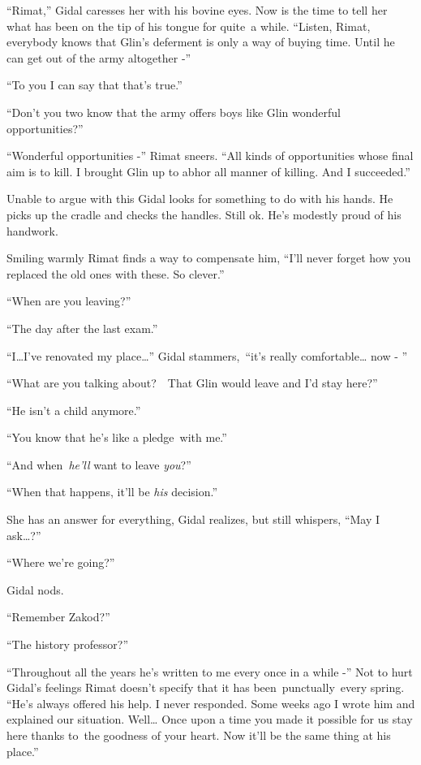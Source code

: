 \documentclass[twoside,11pt]{book}
\begin{document}
``Rimat,'' Gidal caresses her with his bovine eyes. Now is the time to tell her what has been
on the tip of his tongue for quite{\ }a while. ``Listen, Rimat, everybody knows that Glin's
deferment is only a way of buying time. Until he can get out of the army altogether -'' 

``To you I can say that that's true.'' 

``Don't you two know that the army offers boys like Glin wonderful opportunities?'' 

``Wonderful opportunities -'' Rimat sneers. ``All kinds of opportunities whose
final aim is to kill. I brought Glin up to abhor all manner of killing. And I succeeded.''

Unable to argue with this Gidal looks for something to do with his hands. He picks up the cradle and checks the handles.
Still ok. He's modestly proud of his handwork. 

Smiling warmly Rimat finds a way to compensate him, ``I'll never forget how you replaced the old ones with
these. So clever.'' 

``When are you leaving?'' 

``The day after the last exam.'' 

``I{\dots}I've renovated my place{\dots}'' Gidal stammers,~``it's really
comfortable{\dots} now - '' 

``What are you talking about?\ \ That Glin would leave and I'd stay here?'' 

``He isn't a child anymore.'' 

``You know that he's like a pledge{\ }with me.'' 

``And when\textit{\ he'll} want to leave \textit{you}?'' 

``When that happens, it'll be \textit{his} decision.'' 

She has an answer for everything, Gidal realizes, but still whispers, ``May I ask{\dots}?'' 

``Where we're going?'' 

Gidal nods. 

``Remember Zakod?'' 

``The history professor?'' 

``Throughout all the years he's written to me every once in a while -'' Not to hurt Gidal's
feelings Rimat doesn't specify that it has been{\ }{punctually}{\ }every
spring. ``He's always offered his help. I never responded. Some weeks ago I wrote him and explained our
situation. Well{\dots} Once upon a time you made it possible for us stay here thanks to{\ }the goodness
of your heart. Now it'll be the same thing at his place.'' 
\end{document}

